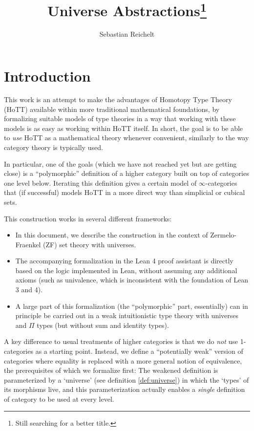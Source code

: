 \documentclass[a4paper]{article}
\title{Universe Abstractions\footnote{Still searching for a better title.}}
\author{Sebastian Reichelt}
\theoremstyle{definition}
\theoremstyle{remark}
\begin{document}
\maketitle

\section{Introduction}

This work is an attempt to make the advantages of Homotopy Type Theory (HoTT) \cite{hottbook} available
within more traditional mathematical foundations, by formalizing suitable models of type theories in
a way that working with these models is as easy as working within HoTT itself. In short, the goal is to
be able to \emph{use} HoTT as a mathematical theory whenever convenient, similarly to the way category
theory is typically used.

In particular, one of the goals (which we have not reached yet but are getting close) is a
``polymorphic'' definition of a higher category built on top of categories one level below. Iterating
this definition gives a certain model of $\infty$-categories that (if successful) models HoTT in a
more direct way than simplicial or cubical sets.

This construction works in several different frameworks:
\begin{itemize}
  \item In this document, we describe the construction in the context of Zermelo-Fraenkel (ZF) set
  theory with universes.
  \item The accompanying formalization in the Lean 4 proof assistant \cite{lean4} is directly based
  on the logic implemented in Lean, without assuming any additional axioms (such as univalence, which
  is inconsistent with the foundation of Lean 3 and 4).
  \item A large part of this formalization (the ``polymorphic'' part, essentially) can in principle be
  carried out in a weak intuitionistic type theory with universes and $\Pi$ types (but without sum and
  identity types).
\end{itemize}

A key difference to usual treatments of higher categories is that we do \emph{not} use 1-categories
as a starting point. Instead, we define a ``potentially weak'' version of categories where equality
is replaced with a more general notion of equivalence, the prerequisites of which we formalize first:
The weakened definition is parameterized by a `universe' (see definition \ref{def:universe}) in
which the `types' of its morphisms live, and this parameterization actually enables a \emph{single}
definition of category to be used at every level.
\end{document}
